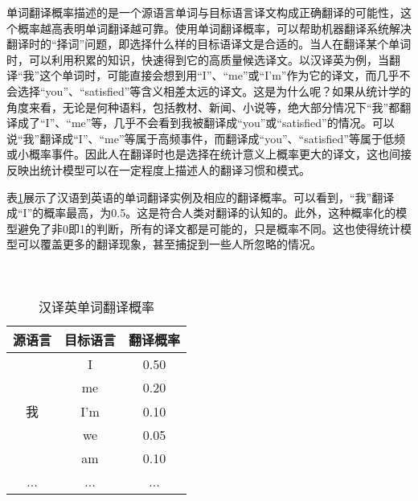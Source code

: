 \parinterval 单词翻译概率描述的是一个源语言单词与目标语言译文构成正确翻译的可能性，这个概率越高表明单词翻译越可靠。使用单词翻译概率，可以帮助机器翻译系统解决翻译时的``择词''问题，即选择什么样的目标语译文是合适的。当人在翻译某个单词时，可以利用积累的知识，快速得到它的高质量候选译文。以汉译英为例，当翻译``我''这个单词时，可能直接会想到用``I''、``me''或``I'm''作为它的译文，而几乎不会选择``you''、``satisfied''等含义相差太远的译文。这是为什么呢？如果从统计学的角度来看，无论是何种语料，包括教材、新闻、小说等，绝大部分情况下``我''都翻译成了``I''、``me''等，几乎不会看到我被翻译成``you''或``satisfied''的情况。可以说``我''翻译成``I''、``me''等属于高频事件，而翻译成``you''、``satisfied''等属于低频或小概率事件。因此人在翻译时也是选择在统计意义上概率更大的译文，这也间接反映出统计模型可以在一定程度上描述人的翻译习惯和模式。

\parinterval 表\ref{tab:3-1}展示了汉语到英语的单词翻译实例及相应的翻译概率。可以看到，``我''翻译成``I''的概率最高，为0.5。这是符合人类对翻译的认知的。此外，这种概率化的模型避免了非0即1的判断，所有的译文都是可能的，只是概率不同。这也使得统计模型可以覆盖更多的翻译现象，甚至捕捉到一些人所忽略的情况。\\ \\ \\

\begin{table}[htp]
    \centering
    \begin{tabular}{c | c  c}
    源语言 & 目标语言 & 翻译概率 \\ \hline
                & I              & 0.50 \\
                & me          & 0.20 \\
    我        & I'm          & 0.10 \\
                & we          & 0.05 \\
                & am         & 0.10 \\
    ...         & ...           & ... \\
    \end{tabular}
    \caption{汉译英单词翻译概率}
    \label{tab:3-1}
\end{table}



